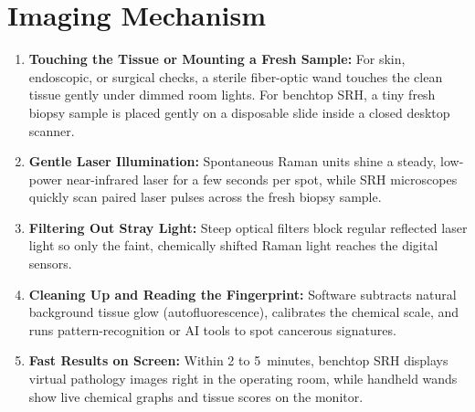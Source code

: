 \section{Imaging Mechanism}
\begin{enumerate}
  \item \textbf{Touching the Tissue or Mounting a Fresh Sample:} For skin, endoscopic, or surgical checks, a sterile fiber-optic wand touches the clean tissue gently under dimmed room lights. For benchtop SRH, a tiny fresh biopsy sample is placed gently on a disposable slide inside a closed desktop scanner.
  \item \textbf{Gentle Laser Illumination:} Spontaneous Raman units shine a steady, low-power near-infrared laser for a few seconds per spot, while SRH microscopes quickly scan paired laser pulses across the fresh biopsy sample.
  \item \textbf{Filtering Out Stray Light:} Steep optical filters block regular reflected laser light so only the faint, chemically shifted Raman light reaches the digital sensors.
  \item \textbf{Cleaning Up and Reading the Fingerprint:} Software subtracts natural background tissue glow (autofluorescence), calibrates the chemical scale, and runs pattern-recognition or AI tools to spot cancerous signatures.
  \item \textbf{Fast Results on Screen:} Within 2 to 5~minutes, benchtop SRH displays virtual pathology images right in the operating room, while handheld wands show live chemical graphs and tissue scores on the monitor.
\end{enumerate}

